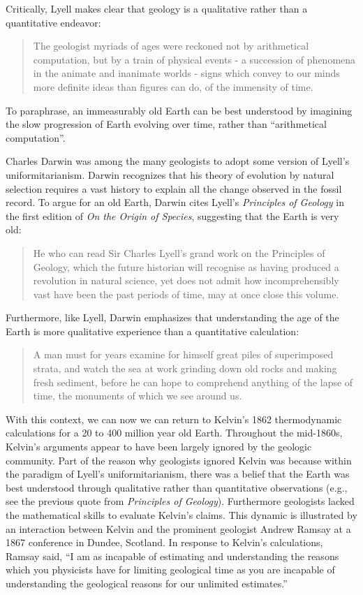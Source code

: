 \documentclass[12pt]{article}
\begin{document}
Critically, Lyell makes clear that geology is a qualitative rather than a quantitative endeavor:

\begin{quote}
  The geologist myriads of ages were reckoned not by arithmetical computation, but by a train of physical events - a succession of phenomena in the animate and inanimate worlds - signs which convey to our minds more definite ideas than figures can do, of the immensity of time. \citep{Lyell_1833}
\end{quote}
To paraphrase, an immeasurably old Earth can be best understood by imagining the slow progression of Earth evolving over time, rather than ``arithmetical computation''.

Charles Darwin was among the many geologists to adopt some version of Lyell's uniformitarianism. Darwin recognizes that his theory of evolution by natural selection requires a vast history to explain all the change observed in the fossil record. To argue for an old Earth, Darwin cites Lyell's \emph{Principles of Geology} in the first edition of \emph{On the Origin of Species}, suggesting that the Earth is very old:

\begin{quote}
  He who can read Sir Charles Lyell's grand work on the Principles of Geology, which the future historian will recognise as having produced a revolution in natural science, yet does not admit how incomprehensibly vast have been the past periods of time, may at once close this volume. \citep{Darwin_1859}
\end{quote}
Furthermore, like Lyell, Darwin emphasizes that understanding the age of the Earth is more qualitative experience than a quantitative calculation:

\begin{quote}
  A man must for years examine for himself great piles of superimposed strata, and watch the sea at work grinding down old rocks and making fresh sediment, before he can hope to comprehend anything of the lapse of time, the monuments of which we see around us. \citep{Darwin_1859}
\end{quote}

With this context, we can now we can return to Kelvin's 1862 thermodynamic calculations for a 20 to 400 million year old Earth. Throughout the mid-1860s, Kelvin's arguments appear to have been largely ignored by the geologic community. Part of the reason why geologists ignored Kelvin was because within the paradigm of Lyell's uniformitarianism, there was a belief that the Earth was best understood through qualitative rather than quantitative observations (e.g., see the previous quote from \emph{Principles of Geology}). Furthermore geologists lacked the mathematical skills to evaluate Kelvin's claims. This dynamic is illustrated by an interaction between Kelvin and the prominent geologist Andrew Ramsay at a 1867 conference in Dundee, Scotland. In response to Kelvin's calculations, Ramsay said, ``I am as incapable of estimating and understanding the reasons which you physicists have for limiting geological time as you are incapable of understanding the geological reasons for our unlimited estimates.''
\end{document}
